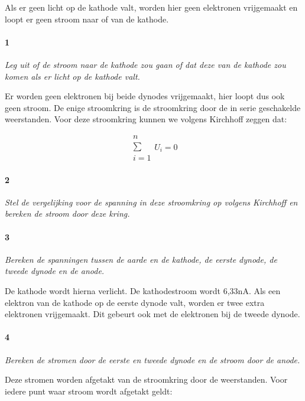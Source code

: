 Als er geen licht op de kathode valt, worden hier geen elektronen
vrijgemaakt en loopt er geen stroom naar of van de kathode. 


\paragraph{1 }

\textit{Leg uit of de stroom naar de kathode zou gaan of dat deze
van de kathode zou komen als er licht op de kathode valt.}

Er worden geen elektronen bij beide dynodes vrijgemaakt, hier loopt
dus ook geen stroom. De enige stroomkring is de stroomkring door de
in serie geschakelde weerstanden. Voor deze stroomkring kunnen we 
volgens Kirchhoff zeggen dat: 

\begin{equation}
\begin{array}{c} 
n\\ 
\sum\\ 
i=1
\end{array}
U_{i}=0
\end{equation}


\paragraph{2}

\textit{Stel de vergelijking voor de spanning in deze stroomkring
op volgens Kirchhoff en bereken de stroom door deze kring.}


\paragraph{3}

\textit{Bereken de spanningen tussen de aarde en de kathode, de eerste
dynode, de tweede dynode en de anode.}

De kathode wordt hierna verlicht. De kathodestroom wordt 6,33nA.
Als een elektron van de kathode op de eerste dynode valt, worden er
twee extra elektronen vrijgemaakt. Dit gebeurt ook met de elektronen
bij de tweede dynode.


\paragraph{4}

\textit{Bereken de stromen door de eerste en tweede dynode en de stroom
door de anode.}

Deze stromen worden afgetakt van de stroomkring door de weerstanden. 
Voor iedere punt waar stroom wordt afgetakt geldt:

